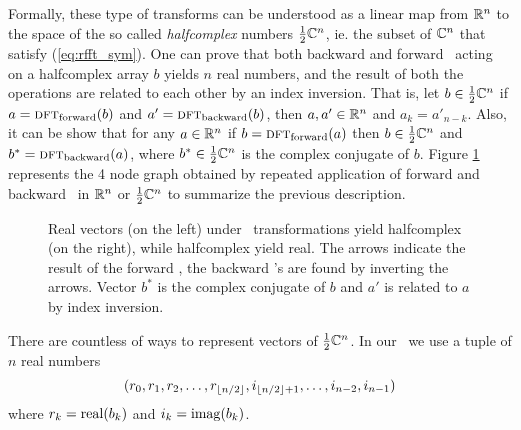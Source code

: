 Formally, these type of transforms can be understood as a linear map from $\mathbb{R}^n$ to the
space of the so called \emph{halfcomplex} numbers $\frac{1}{2}\mathbb{C}^n$, ie.
the subset of $\mathbb{C}^n$ that satisfy (\ref{eq:rfft_sym}).
One can prove that both backward and forward \dft\ acting on a halfcomplex array
$b$ yields $n$ real numbers, and the result of both the operations are related to
each other by an index inversion. That is, let $b\in \frac{1}{2}\mathbb{C}^n$ if 
$a = \textsc{dft}_{\textrm{forward}}(b)$ and 
$a' =\textsc{dft}_{\textrm{backward}}(b)$, then $a,a'\in \mathbb{R}^n$ and $a_k = a'_{n-k}$.
Also, it can be show that for any $a\in\mathbb{R}^n$ if $b=\textsc{dft}_{\textrm{forward}}(a)$ then
$b\in\frac{1}{2}\mathbb{C}^n$ and $b^* = \textsc{dft}_{\textrm{backward}}(a)$, where $b^*\in\frac{1}{2}\mathbb{C}^n$ is the complex
conjugate of $b$.
Figure \ref{fig:halfcomplex}
represents the 4 node graph obtained by repeated application of forward and
backward \dft\ in $\mathbb{R}^n$ or $\frac{1}{2}\mathbb{C}^n$ to summarize the previous
description.
\begin{figure}
    \centering
    \caption{Real vectors (on the left) under \dft\ transformations yield
    halfcomplex (on the right),
    while halfcomplex yield real. The arrows indicate the result of the forward
    \dft, the backward \dft's are found by inverting the arrows. Vector $b^*$ is
    the complex conjugate of $b$ and $a'$ is related to $a$ by index inversion.}
    \label{fig:halfcomplex}
\end{figure}

There are countless of ways to represent vectors of $\frac{1}{2}\mathbb{C}^n$.
In our \api\ we use a tuple of $n$ real numbers
\[ 
    (r_0,r_1,r_2,\ldots,r_{ \lfloor n/2 \rfloor },i_{\lfloor n/2 \rfloor+1},\ldots,i_{n-2},i_{n-1})
\]
where $r_k = \operatorname{real}(b_k)$ and $i_k = \operatorname{imag}(b_k)$.

% 
% 

